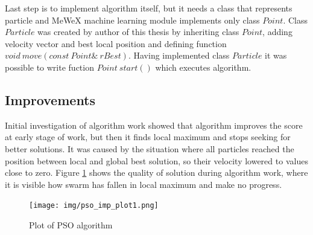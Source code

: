 
Last step is to implement algorithm itself, but it needs a class that represents particle and MeWeX machine learning module implements only class \(Point\).
Class \(Particle\) was created by author of this thesis by inheriting class \(Point\), adding velocity vector and best local position and defining 
function \(void\ move(const\ Point\&\ rBest)\).
Having implemented class \(Particle\) it was possible to write fuction \(Point\ start()\) which executes algorithm. 



\subsection{Improvements}\label{pso_improv}
Initial investigation of algorithm work showed that algorithm improves the score at early stage of work, but then it finds local maximum 
and stops seeking for better solutions. It was caused by the situation where all particles reached the position between 
local and global best solution, so their velocity lowered to values close to zero. Figure \ref{img_pso_imp_plot1} shows the quality of solution 
during algorithm work, where it is visible how swarm has fallen in local maximum and make no progress.
\begin{figure}[ht]
\centering
	\texttt{[image: img/pso\_imp\_plot1.png]}
	\caption{Plot of PSO algorithm }
	\label{img_pso_imp_plot1}
\end{figure}

